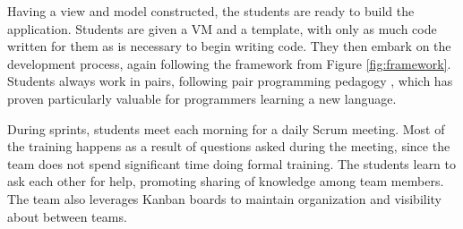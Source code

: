 
Having a view and model constructed, the students are ready to build the application. Students are given a VM and a template, with only as much code written for them as is necessary to begin writing code. They then embark on the development process, again following the framework from Figure \ref{fig:framework}. Students always work in pairs, following pair programming pedagogy \cite{2002PairProgramming}, which has proven particularly valuable for programmers learning a new language. 


During sprints, students meet each morning for a daily Scrum meeting. Most of the training happens as a result of questions asked during the meeting, since the team does not spend significant time doing formal training. The students learn to ask each other for help, promoting sharing of knowledge among team members. The team also leverages Kanban boards \cite{anderson2010kanban} to maintain organization and visibility about between teams. 




